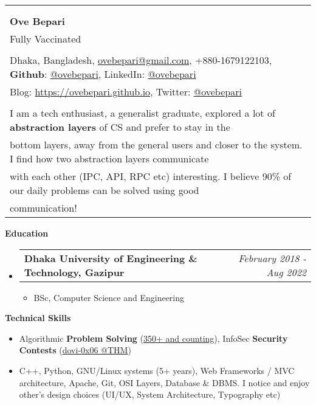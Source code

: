 \documentclass[legalpaper,10pt]{article}
\makeatletter
\newcommand{\resheading}[1]{{\large \colorbox{mygrey}{\begin{minipage}{\textwidth}{\textbf{#1 \vphantom{p\^{E}}}}\end{minipage}}}}
\newcommand{\ressubheading}[4]{
	\begin{tabular*}{7.1in}{l@{\extracolsep{\fill}}r}
		\textbf{#1} & \textit{#4} \\
	\end{tabular*}\vspace{-6pt}}
\makeatother
\begin{document}
	\begin{tabular*}{7.5in}{l@{\extracolsep{\fill}}}
		\\
		\\
		\\
		\textbf{\large Ove Bepari}\\
		{\scriptsize Fully Vaccinated}
		\\
		\\
		Dhaka, Bangladesh, \href{mailto:ovebepari@gmail.com}{ovebepari@gmail.com}, +880-1679122103, \textbf{Github}: \href{https://github.com/ovebepari}{@ovebepari}, LinkedIn: \href{https://linkedin.com/in/ovebepari}{@ovebepari} \\
		 Blog: \url{https://ovebepari.github.io}, Twitter: \href{https://twitter.com/ovebepari}{@ovebepari}
		\\
		\\
		I am a tech enthusiast, a generalist graduate, explored a lot of \textbf{abstraction layers} of CS and prefer to stay in the\\bottom layers, away from the general users and closer to the system. I find how two abstraction layers communicate\\with each other (IPC, API, RPC etc) interesting. I believe 90\% of our daily problems can be solved using good\\ communication!
	\end{tabular*}
	
	\vspace{0.25in}
	
	\resheading{Education}
	\begin{itemize}
	
		\item \ressubheading{Dhaka University of Engineering \& Technology, Gazipur}{}{}{February 2018 - Aug 2022}
		\begin{itemize}
			\item BSc, Computer Science and Engineering
		\end{itemize}
	
	\end{itemize}
	
	\vspace{0.20in}
	
	\resheading{Technical Skills}
	\begin{itemize}
		\item Algorithmic \textbf{Problem Solving} (\href{https://www.stopstalk.com/user/profile/ovebepari}{350+ and counting}), InfoSec \textbf{Security Contests} (\href{https://tryhackme.com/p/dovi}{dovi-0x06 @THM})
		\item C++, Python, GNU/Linux systems (5+ years), Web Frameworks / MVC architecture, Apache, Git, OSI Layers, Database \& DBMS. I notice and enjoy other's design choices (UI/UX, System Architecture, Typography etc)
	\end{itemize}
\end{document}

